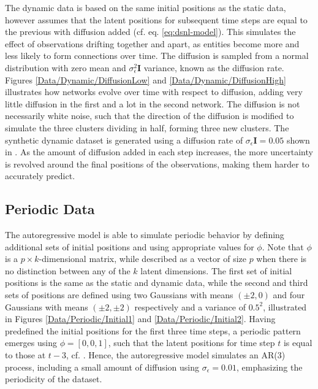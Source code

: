    The dynamic data is based on the same initial positions as the static data, however assumes that the latent positions for subsequent time steps are equal to the previous with diffusion added (cf. eq. \ref{eq:dsnl-model}). This simulates the effect of observations drifting together and apart, as entities become more and less likely to form connections over time. The diffusion is sampled from a normal distribution with zero mean and $\sigma_\epsilon^2\bm{I}$ variance, known as the diffusion rate. Figures \ref{Data/Dynamic/DiffusionLow} and \ref{Data/Dynamic/DiffusionHigh} illustrates how networks evolve over time with respect to diffusion, adding very little diffusion in the first and a lot in the second network.
    The diffusion is not necessarily white noise, such that the direction of the diffusion is modified to simulate the three clusters dividing in half, forming three new clusters.
    The synthetic dynamic dataset is generated using a diffusion rate of $\sigma_\epsilon\bm{I}=0.05$ shown in . 
    As the amount of diffusion added in each step increases, the more uncertainty is revolved around the final positions of the observations, making them harder to accurately predict.

\subsection{Periodic Data}

    The autoregressive model is able to simulate periodic behavior by defining additional sets of initial positions and using appropriate values for $\phi$. Note that $\phi$ is a $p\times k$-dimensional matrix, while described as a vector of size $p$ when there is no distinction between any of the $k$ latent dimensions.
    The first set of initial positions is the same as the static and dynamic data, while the second and third sets of positions are defined using two Gaussians with means $(\pm2,0)$ and four Gaussians with means $(\pm2,\pm2)$ respectively and a variance of $0.5^2$, illustrated in Figures \ref{Data/Periodic/Initial1} and \ref{Data/Periodic/Initial2}.
    Having predefined the initial positions for the first three time steps, a periodic pattern emerges using $\phi=[0, 0, 1]$, such that the latent positions for time step $t$ is equal to those at $t-3$, cf. .
    Hence, the autoregressive model simulates an AR(3) process, including a small amount of diffusion using $\sigma_\epsilon=0.01$, emphasizing the periodicity of the dataset.
    
